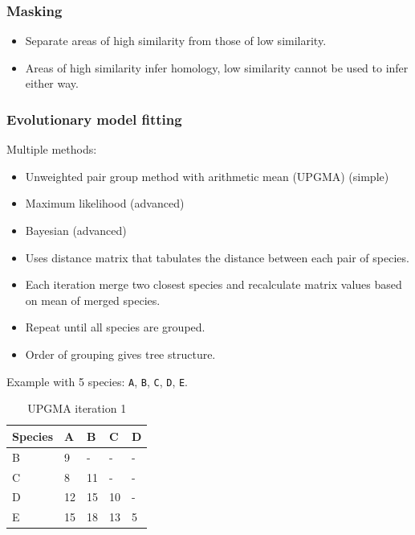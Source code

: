 \documentclass[a4paper]{article}
\begin{document}
\subsubsection{Masking}

\begin{itemize}
  \item
    Separate areas of high similarity from those of low similarity.

  \item
    Areas of high similarity infer homology, low similarity cannot be used to
    infer either way.
\end{itemize}

\subsubsection{Evolutionary model fitting}

Multiple methods:

\begin{itemize}
  \item
    Unweighted pair group method with arithmetic mean (UPGMA) (simple)

  \item
    Maximum likelihood (advanced)

  \item
    Bayesian (advanced)
\end{itemize}


\begin{itemize}
  \item
    Uses distance matrix that tabulates the distance between each pair of
    species.

  \item
    Each iteration merge two closest species and recalculate matrix values based
    on mean of merged species.

  \item
    Repeat until all species are grouped.

  \item
    Order of grouping gives tree structure.
\end{itemize}

Example with 5 species: \texttt{A}, \texttt{B}, \texttt{C}, \texttt{D},
\texttt{E}.

\begin{table}[h!]
  \centering
  \begin{tabular}{@{}lllll@{}}
    \toprule
    Species & A  & B  & C  & D \\
    \midrule
    B       & 9  & -  & -  & - \\
    C       & 8  & 11 & -  & - \\
    D       & 12 & 15 & 10 & - \\
    E       & 15 & 18 & 13 & 5 \\
    \bottomrule
  \end{tabular}
  \caption{UPGMA iteration 1}
  \label{tab:upgma_1}
\end{table}
\FloatBarrier
\end{document}
